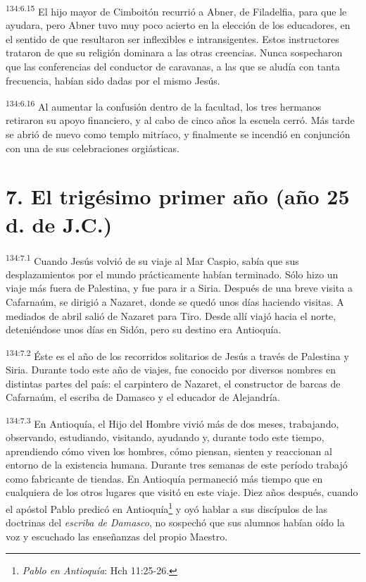 \par
\textsuperscript{134:6.15} El hijo mayor de Cimboitón recurrió a Abner, de Filadelfia, para que le ayudara, pero Abner tuvo muy poco acierto en la elección de los educadores, en el sentido de que resultaron ser inflexibles e intransigentes. Estos instructores trataron de que su religión dominara a las otras creencias. Nunca sospecharon que las conferencias del conductor de caravanas, a las que se aludía con tanta frecuencia, habían sido dadas por el mismo Jesús.

\par
\textsuperscript{134:6.16} Al aumentar la confusión dentro de la facultad, los tres hermanos retiraron su apoyo financiero, y al cabo de cinco años la escuela cerró. Más tarde se abrió de nuevo como templo mitríaco, y finalmente se incendió en conjunción con una de sus celebraciones orgiásticas.

\section*{7. El trigésimo primer año (año 25 d. de J.C.)}
\par
\textsuperscript{134:7.1} Cuando Jesús volvió de su viaje al Mar Caspio, sabía que sus desplazamientos por el mundo prácticamente habían terminado. Sólo hizo un viaje más fuera de Palestina, y fue para ir a Siria. Después de una breve visita a Cafarnaúm, se dirigió a Nazaret, donde se quedó unos días haciendo visitas. A mediados de abril salió de Nazaret para Tiro. Desde allí viajó hacia el norte, deteniéndose unos días en Sidón, pero su destino era Antioquía.

\par
\textsuperscript{134:7.2} Éste es el año de los recorridos solitarios de Jesús a través de Palestina y Siria. Durante todo este año de viajes, fue conocido por diversos nombres en distintas partes del país: el carpintero de Nazaret, el constructor de barcas de Cafarnaúm, el escriba de Damasco y el educador de Alejandría.

\par
\textsuperscript{134:7.3} En Antioquía, el Hijo del Hombre vivió más de dos meses, trabajando, observando, estudiando, visitando, ayudando y, durante todo este tiempo, aprendiendo cómo viven los hombres, cómo piensan, sienten y reaccionan al entorno de la existencia humana. Durante tres semanas de este período trabajó como fabricante de tiendas. En Antioquía permaneció más tiempo que en cualquiera de los otros lugares que visitó en este viaje. Diez años después, cuando el apóstol Pablo predicó en Antioquía\footnote{\textit{Pablo en Antioquía}: Hch 11:25-26.} y oyó hablar a sus discípulos de las doctrinas del \textit{escriba de Damasco}, no sospechó que sus alumnos habían oído la voz y escuchado las enseñanzas del propio Maestro.

